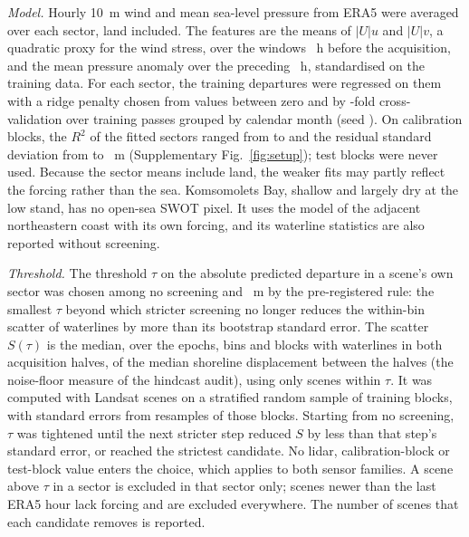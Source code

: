 \emph{Model.} Hourly 10~m wind and mean sea-level pressure from ERA5\citep{hersbach2020} were averaged over each sector, land included. The features are the means of $|U|u$ and $|U|v$, a quadratic proxy for the wind stress, over the windows ~h before the acquisition, and the mean pressure anomaly over the preceding ~h, standardised on the training data. For each sector, the training departures were regressed on them with a ridge penalty chosen from  values between zero and  by -fold cross-validation over training passes grouped by calendar month (seed ). On calibration blocks, the $R^2$ of the  fitted sectors ranged from  to  and the residual standard deviation from  to ~m (Supplementary Fig.~\ref{fig:setup}); test blocks were never used. Because the sector means include land, the weaker fits may partly reflect the forcing rather than the sea. Komsomolets Bay, shallow and largely dry at the low stand, has no open-sea SWOT pixel. It uses the model of the adjacent northeastern coast with its own forcing, and its waterline statistics are also reported without screening.

\emph{Threshold.} The threshold $\tau$ on the absolute predicted departure in a scene's own sector was chosen among no screening and ~m by the pre-registered rule: the smallest $\tau$ beyond which stricter screening no longer reduces the within-bin scatter of waterlines by more than its bootstrap standard error. The scatter $S(\tau)$ is the median, over the epochs, bins and blocks with waterlines in both acquisition halves, of the median shoreline displacement between the halves (the noise-floor measure of the hindcast audit), using only scenes within $\tau$. It was computed with Landsat scenes on a stratified random sample of training blocks, with standard errors from  resamples of those blocks. Starting from no screening, $\tau$ was tightened until the next stricter step reduced $S$ by less than that step's standard error, or reached the strictest candidate. No lidar, calibration-block or test-block value enters the choice, which applies to both sensor families. A scene above $\tau$ in a sector is excluded in that sector only; scenes newer than the last ERA5 hour lack forcing and are excluded everywhere. The number of scenes that each candidate removes is reported.
